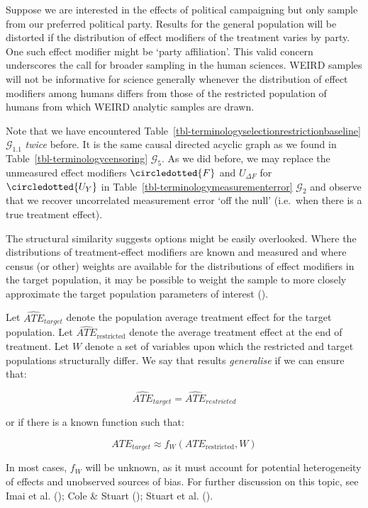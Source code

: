\documentclass[
  single column]{article}
\begin{document}
Suppose we are interested in the effects of political campaigning but
only sample from our preferred political party. Results for the general
population will be distorted if the distribution of effect modifiers of
the treatment varies by party. One such effect modifier might be `party
affiliation'. This valid concern underscores the call for broader
sampling in the human sciences. WEIRD samples will not be informative
for science generally whenever the distribution of effect modifiers
among humans differs from those of the restricted population of humans
from which WEIRD analytic samples are drawn.

Note that we have encountered
Table~\ref{tbl-terminologyselectionrestrictionbaseline}
\(\mathcal{G}_{1.1}\) \emph{twice} before. It is the same causal
directed acyclic graph as we found in
Table~\ref{tbl-terminologycensoring} \(\mathcal{G}_5\). As we did
before, we may replace the unmeasured effect modifiers
\(\circledotted{F}\) and \(U_{\Delta F}\) for \(\circledotted{U_Y}\) in
Table~\ref{tbl-terminologymeasurementerror} \(\mathcal{G}_2\) and
observe that we recover uncorrelated measurement error `off the null'
(i.e.~when there is a true treatment effect).

The structural similarity suggests options might be easily overlooked.
Where the distributions of treatment-effect modifiers are known and
measured and where census (or other) weights are available for the
distributions of effect modifiers in the target population, it may be
possible to weight the sample to more closely approximate the target
population parameters of interest ().

Let \(\widehat{ATE}_{target}\) denote the population average treatment
effect for the target population. Let
\(\widehat{ATE}_{\text{restricted}}\) denote the average treatment
effect at the end of treatment. Let \(W\) denote a set of variables upon
which the restricted and target populations structurally differ. We say
that results \emph{generalise} if we can ensure that:

\[
\widehat{ATE}_{target} = \widehat{ATE}_{restricted}
\]

or if there is a known function such that:

\[
ATE_{target} \approx f_W(ATE_{\text{restricted}}, W)
\]

In most cases, \(f_W\) will be unknown, as it must account for potential
heterogeneity of effects and unobserved sources of bias. For further
discussion on this topic, see Imai et al.
(); Cole \& Stuart
(); Stuart et al.
().
\end{document}
